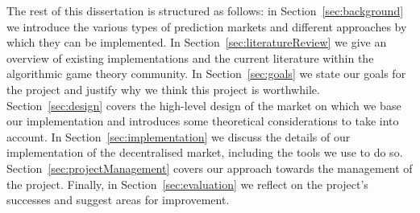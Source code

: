The rest of this dissertation is structured as follows: in
Section~\ref{sec:background} we introduce the various types of prediction
markets and different approaches by which they can be implemented. In
Section~\ref{sec:literatureReview} we give an overview of existing
implementations and the current literature within the algorithmic game theory
community. In Section~\ref{sec:goals} we state our goals for the project and
justify why we think this project is worthwhile. Section~\ref{sec:design}
covers the high-level design of the market on which we base our implementation
and introduces some theoretical considerations to take into account. In
Section~\ref{sec:implementation} we discuss the details of our implementation
of the decentralised market, including the tools we use to do so.
Section~\ref{sec:projectManagement} covers our approach towards the management
of the project. Finally, in Section~\ref{sec:evaluation} we reflect on the
project's successes and suggest areas for improvement.
